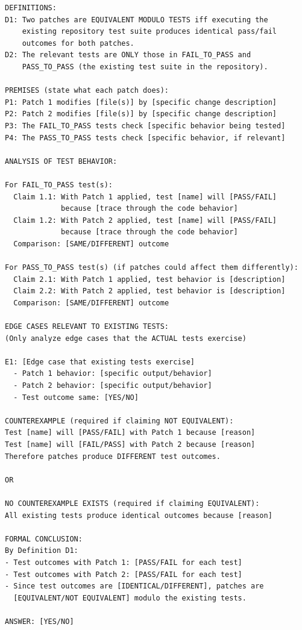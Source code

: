 \documentclass[]{meta}
\begin{document}
\begin{tcolorbox}[
  title=Semi-formal Proof of Patch Equivalence,
  colback=gray!5,
  colframe=gray!75!black,
  fonttitle=\bfseries,
  breakable,
  enhanced
]
\begin{verbatim}
DEFINITIONS:
D1: Two patches are EQUIVALENT MODULO TESTS iff executing the
    existing repository test suite produces identical pass/fail
    outcomes for both patches.
D2: The relevant tests are ONLY those in FAIL_TO_PASS and
    PASS_TO_PASS (the existing test suite in the repository).

PREMISES (state what each patch does):
P1: Patch 1 modifies [file(s)] by [specific change description]
P2: Patch 2 modifies [file(s)] by [specific change description]
P3: The FAIL_TO_PASS tests check [specific behavior being tested]
P4: The PASS_TO_PASS tests check [specific behavior, if relevant]

ANALYSIS OF TEST BEHAVIOR:

For FAIL_TO_PASS test(s):
  Claim 1.1: With Patch 1 applied, test [name] will [PASS/FAIL]
             because [trace through the code behavior]
  Claim 1.2: With Patch 2 applied, test [name] will [PASS/FAIL]
             because [trace through the code behavior]
  Comparison: [SAME/DIFFERENT] outcome

For PASS_TO_PASS test(s) (if patches could affect them differently):
  Claim 2.1: With Patch 1 applied, test behavior is [description]
  Claim 2.2: With Patch 2 applied, test behavior is [description]
  Comparison: [SAME/DIFFERENT] outcome

EDGE CASES RELEVANT TO EXISTING TESTS:
(Only analyze edge cases that the ACTUAL tests exercise)

E1: [Edge case that existing tests exercise]
  - Patch 1 behavior: [specific output/behavior]
  - Patch 2 behavior: [specific output/behavior]
  - Test outcome same: [YES/NO]

COUNTEREXAMPLE (required if claiming NOT EQUIVALENT):
Test [name] will [PASS/FAIL] with Patch 1 because [reason]
Test [name] will [FAIL/PASS] with Patch 2 because [reason]
Therefore patches produce DIFFERENT test outcomes.

OR

NO COUNTEREXAMPLE EXISTS (required if claiming EQUIVALENT):
All existing tests produce identical outcomes because [reason]

FORMAL CONCLUSION:
By Definition D1:
- Test outcomes with Patch 1: [PASS/FAIL for each test]
- Test outcomes with Patch 2: [PASS/FAIL for each test]
- Since test outcomes are [IDENTICAL/DIFFERENT], patches are
  [EQUIVALENT/NOT EQUIVALENT] modulo the existing tests.

ANSWER: [YES/NO]
\end{verbatim}
\end{tcolorbox}
\end{document}
